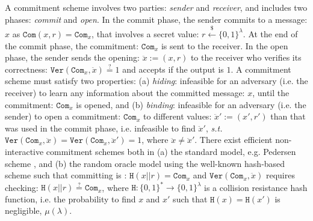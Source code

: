  A commitment scheme involves two parties:  \emph{sender} and  \emph{receiver}, and includes  two phases: \emph{commit} and  \emph{open}. In the commit phase, the sender  commits to a message: $x$ as $\mathtt{Com}(x,r)=\mathtt{Com}_{\scriptscriptstyle x}$, that involves a secret value: $r\stackrel{\scriptscriptstyle\$}\leftarrow \{0,1\}^{\scriptscriptstyle\lambda}$. At the end of the commit phase,  the commitment: $\mathtt{Com}_{\scriptscriptstyle x}$ is sent to the receiver. In the open phase, the sender sends the opening: $\ddot{x}:=(x,r)$ to the receiver who verifies its correctness: $\mathtt{Ver}(\mathtt{Com}_{\scriptscriptstyle x},\ddot{x})\stackrel{\scriptscriptstyle ?}=1$ and accepts if the output is $1$.  A commitment scheme must satisfy two properties: (a) \textit{hiding}: infeasible for an adversary (i.e. the receiver) to learn any information about the committed  message: $x$, until the commitment: $\mathtt{Com}_{\scriptscriptstyle x}$ is opened, and (b) \textit{binding}:   infeasible for an adversary (i.e. the sender) to open a commitment: $\mathtt{Com}_{\scriptscriptstyle x}$ to different values: $\ddot{x}':=(x',r')$ than that was  used in the commit phase, i.e. infeasible to find  $\ddot{x}'$, \textit{s.t.} $\mathtt{Ver}(\mathtt{Com}_{\scriptscriptstyle x},\ddot{x})=\mathtt{Ver}(\mathtt{Com}_{\scriptscriptstyle x},\ddot{x}')=1$, where $\ddot{x}\neq \ddot{x}'$.  There exist efficient non-interactive  commitment schemes both in (a) the standard model, e.g. Pedersen scheme \cite{Pedersen91}, and (b)  the random oracle model using the well-known hash-based scheme such that committing  is : $\mathtt{H}(x||r)=\mathtt{Com}_{\scriptscriptstyle x}$ and $\mathtt{Ver}(\mathtt{Com}_{\scriptscriptstyle x},\ddot{x})$ requires checking: $\mathtt{H}(x||r)\stackrel{\scriptscriptstyle ?}=\mathtt{Com}_{\scriptscriptstyle x}$, where $\mathtt{H}:\{0,1\}^{\scriptscriptstyle *}\rightarrow \{0,1\}^{\scriptscriptstyle \lambda}$ is a collision resistance hash function, i.e. the probability to find $x$ and $x'$ such that $\mathtt{H}(x)=\mathtt{H}(x')$ is negligible, $\mu(\lambda)$.
%
